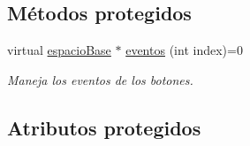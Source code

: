\subsection*{Métodos protegidos}
\begin{DoxyCompactItemize}
\item 
virtual \hyperlink{classespacio_base}{espacio\+Base} $\ast$ \hyperlink{classmenu_base_a5a88a45efd3bc47b4731fb21749a97d5}{eventos} (int index)=0
\begin{DoxyCompactList}\small\item\em Maneja los eventos de los botones. \end{DoxyCompactList}\end{DoxyCompactItemize}
\subsection*{Atributos protegidos}
